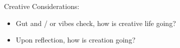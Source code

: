 
	\item Creative Considerations:
	\begin{itemize}
		\item Gut and / or vibes check, how is creative life going?




		\item Upon reflection, how is creation going?
	\end{itemize}
